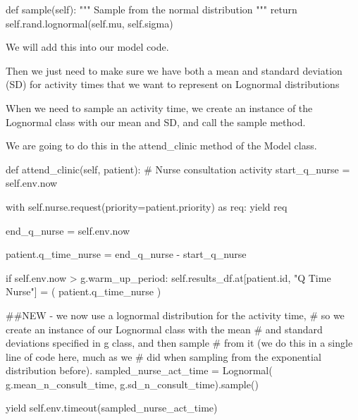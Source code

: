 \documentclass[
  letterpaper,
  DIV=11,
  numbers=noendperiod]{scrreprt}
\newenvironment{Shaded}{\begin{snugshade}}{\end{snugshade}}
\newcommand{\BuiltInTok}[1]{\textcolor[rgb]{0.00,0.23,0.31}{#1}}
\newcommand{\CommentTok}[1]{\textcolor[rgb]{0.37,0.37,0.37}{#1}}
\newcommand{\ControlFlowTok}[1]{\textcolor[rgb]{0.00,0.23,0.31}{#1}}
\newcommand{\ImportTok}[1]{\textcolor[rgb]{0.00,0.46,0.62}{#1}}
\newcommand{\KeywordTok}[1]{\textcolor[rgb]{0.00,0.23,0.31}{#1}}
\newcommand{\NormalTok}[1]{\textcolor[rgb]{0.00,0.23,0.31}{#1}}
\newcommand{\OperatorTok}[1]{\textcolor[rgb]{0.37,0.37,0.37}{#1}}
\newcommand{\StringTok}[1]{\textcolor[rgb]{0.13,0.47,0.30}{#1}}
\newcommand{\VariableTok}[1]{\textcolor[rgb]{0.07,0.07,0.07}{#1}}
\begin{document}
\begin{Shaded}
\begin{Highlighting}[]
    \KeywordTok{def}\NormalTok{ sample(}\VariableTok{self}\NormalTok{):}
        \CommentTok{"""}
\CommentTok{        Sample from the normal distribution}
\CommentTok{        """}
        \ControlFlowTok{return} \VariableTok{self}\NormalTok{.rand.lognormal(}\VariableTok{self}\NormalTok{.mu, }\VariableTok{self}\NormalTok{.sigma)}
\end{Highlighting}
\end{Shaded}

We will add this into our model code.

Then we just need to make sure we have both a mean and standard
deviation (SD) for activity times that we want to represent on Lognormal
distributions

When we need to sample an activity time, we create an instance of the
Lognormal class with our mean and SD, and call the sample method.

We are going to do this in the attend\_clinic method of the Model class.

\begin{Shaded}
\begin{Highlighting}[]
\KeywordTok{def}\NormalTok{ attend\_clinic(}\VariableTok{self}\NormalTok{, patient):}
        \CommentTok{\# Nurse consultation activity}
\NormalTok{        start\_q\_nurse }\OperatorTok{=} \VariableTok{self}\NormalTok{.env.now}

        \ControlFlowTok{with} \VariableTok{self}\NormalTok{.nurse.request(priority}\OperatorTok{=}\NormalTok{patient.priority) }\ImportTok{as}\NormalTok{ req:}
            \ControlFlowTok{yield}\NormalTok{ req}

\NormalTok{            end\_q\_nurse }\OperatorTok{=} \VariableTok{self}\NormalTok{.env.now}

\NormalTok{            patient.q\_time\_nurse }\OperatorTok{=}\NormalTok{ end\_q\_nurse }\OperatorTok{{-}}\NormalTok{ start\_q\_nurse}

            \ControlFlowTok{if} \VariableTok{self}\NormalTok{.env.now }\OperatorTok{\textgreater{}}\NormalTok{ g.warm\_up\_period:}
                \VariableTok{self}\NormalTok{.results\_df.at[patient.}\BuiltInTok{id}\NormalTok{, }\StringTok{"Q Time Nurse"}\NormalTok{] }\OperatorTok{=}\NormalTok{ (}
\NormalTok{                    patient.q\_time\_nurse}
\NormalTok{                )}

            \CommentTok{\#\#NEW {-} we now use a lognormal distribution for the activity time,}
            \CommentTok{\# so we create an instance of our Lognormal class with the mean}
            \CommentTok{\# and standard deviations specified in g class, and then sample}
            \CommentTok{\# from it (we do this in a single line of code here, much as we}
            \CommentTok{\# did when sampling from the exponential distribution before).}
\NormalTok{            sampled\_nurse\_act\_time }\OperatorTok{=}\NormalTok{ Lognormal(}
\NormalTok{                g.mean\_n\_consult\_time, g.sd\_n\_consult\_time).sample()}

            \ControlFlowTok{yield} \VariableTok{self}\NormalTok{.env.timeout(sampled\_nurse\_act\_time)}
\end{Highlighting}
\end{Shaded}
\end{document}
